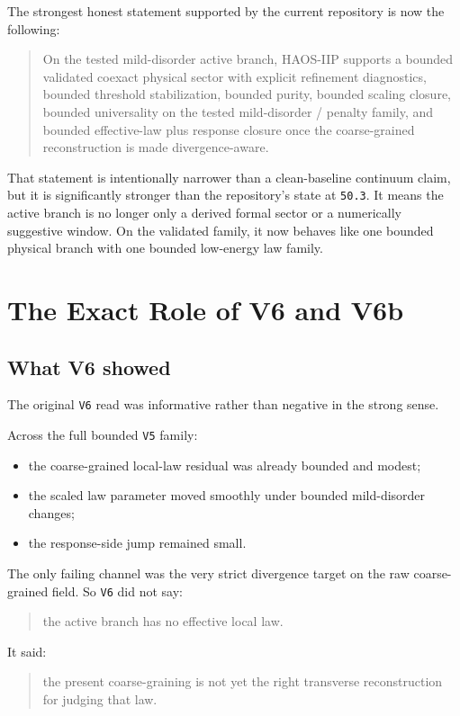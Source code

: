 \documentclass[11pt]{article}
\begin{document}
The strongest honest statement supported by the current repository is now the following:

\begin{quote}
On the tested mild-disorder active branch, HAOS-IIP supports a bounded validated coexact physical sector with explicit refinement diagnostics, bounded threshold stabilization, bounded purity, bounded scaling closure, bounded universality on the tested mild-disorder / penalty family, and bounded effective-law plus response closure once the coarse-grained reconstruction is made divergence-aware.
\end{quote}

That statement is intentionally narrower than a clean-baseline continuum claim, but it is significantly stronger than the repository's state at \texttt{50.3}. It means the active branch is no longer only a derived formal sector or a numerically suggestive window. On the validated family, it now behaves like one bounded physical branch with one bounded low-energy law family.

\section{The Exact Role of V6 and V6b}

\subsection{What V6 showed}

The original \texttt{V6} read was informative rather than negative in the strong sense.

Across the full bounded \texttt{V5} family:
\begin{itemize}
\item the coarse-grained local-law residual was already bounded and modest;
\item the scaled law parameter moved smoothly under bounded mild-disorder changes;
\item the response-side jump remained small.
\end{itemize}

The only failing channel was the very strict divergence target on the raw coarse-grained field. So \texttt{V6} did not say:
\begin{quote}
the active branch has no effective local law.
\end{quote}

It said:
\begin{quote}
the present coarse-graining is not yet the right transverse reconstruction for judging that law.
\end{quote}
\end{document}

